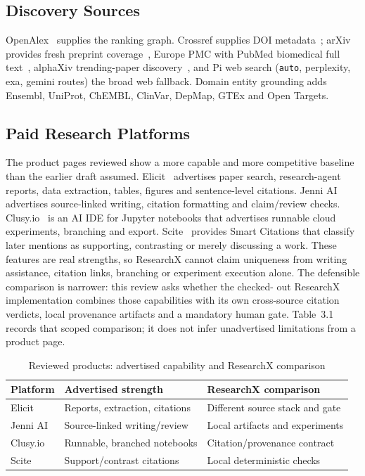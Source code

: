 \documentclass[12pt,a4paper]{report}
\numberwithin{equation}{chapter}
\begin{document}
\subsection{Discovery Sources}
OpenAlex~\cite{openalex} supplies the ranking graph. Crossref supplies DOI
metadata~\cite{crossref}; arXiv provides fresh preprint
coverage~\cite{arxiv}, Europe PMC with PubMed biomedical full
text~\cite{europepmc}, alphaXiv trending-paper discovery~\cite{alphaxiv},
and Pi web search (\texttt{auto}, perplexity, exa, gemini routes) the broad
web fallback. Domain entity grounding adds Ensembl, UniProt, ChEMBL,
ClinVar, DepMap, GTEx and Open Targets.

\subsection{Paid Research Platforms}
The product pages reviewed show a more capable and more competitive baseline
than the earlier draft assumed. Elicit~\cite{elicit} advertises paper search,
research-agent reports, data extraction, tables, figures and sentence-level
citations. Jenni AI~\cite{jenni} advertises source-linked writing, citation
formatting and claim/review checks. Clusy.io~\cite{clusy} is an AI IDE for
Jupyter notebooks that advertises runnable cloud experiments, branching and
export. Scite~\cite{scite} provides Smart Citations that classify later
mentions as supporting, contrasting or merely discussing a work. These
features are real strengths, so ResearchX cannot claim uniqueness from
writing assistance, citation links, branching or experiment execution alone.
The defensible comparison is narrower: this review asks whether the checked-
out ResearchX implementation combines those capabilities with its own
cross-source citation verdicts, local provenance artifacts and a mandatory
human gate. Table~3.1 records that scoped comparison; it does not infer
unadvertised limitations from a product page.

\begin{table}[ht]
\centering
\caption{Reviewed products: advertised capability and ResearchX comparison}
\small
\begin{tabular}{@{}L{2.3cm}L{4.7cm}L{5.3cm}@{}}
\toprule
Platform & Advertised strength & ResearchX comparison \\
\midrule
Elicit & Reports, extraction, citations & Different source stack and gate \\
Jenni AI & Source-linked writing/review & Local artifacts and experiments \\
Clusy.io & Runnable, branched notebooks & Citation/provenance contract \\
Scite & Support/contrast citations & Local deterministic checks \\
\bottomrule
\end{tabular}
\end{table}
\end{document}
